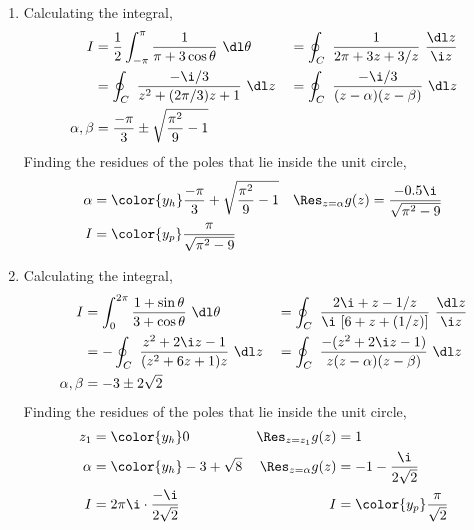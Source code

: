 \begin{enumerate}
    \item Calculating the integral,
          \begin{align}
              I             & = \frac{1}{2} \int_{-\pi}^{\pi} \frac{1}
              {\pi + 3\cos\theta} \ \dl \theta
                            &
                            & = \oint_C\ \frac{1}{2\pi + 3z + 3/z}
              \ \frac{\dl z}{\i z}                                             \\
                            & = \oint_C\ \frac{-\i/3}{z^2 + (2\pi/3) z + 1}
              \ \dl z       &
                            & = \oint_C\ \frac{-\i/3}{(z - \alpha)(z - \beta)}
              \ \dl z                                                          \\
              \alpha, \beta & = \frac{-\pi}{3} \pm \sqrt{\frac{\pi^2}{9} - 1}
          \end{align}
          Finding the residues of the poles that lie inside the unit circle,
          \begin{align}
              \alpha                 & = \color{y_h} \frac{-\pi}{3}
              + \sqrt{\frac{\pi^2}{9} - 1}
                                     &
              \Res_{z = \alpha} g(z) & = \frac{-0.5\i}{\sqrt{\pi^2 - 9}}          \\
              I                      & = \color{y_p} \frac{\pi}{\sqrt{\pi^2 - 9}}
          \end{align}

    \item Calculating the integral,
          \begin{align}
              I             & = \int_{0}^{2\pi} \frac{1 + \sin \theta}
              {3 + \cos\theta} \ \dl \theta
                            &
                            & = \oint_C\ \frac{2\i + z - 1/z}{\i\ [6 + z + (1/z)]}
              \ \frac{\dl z}{\i z}                                                 \\
                            & = -\oint_C\ \frac{z^2 + 2\i z - 1}{(z^2 + 6z + 1)z}
              \ \dl z       &
                            & = \oint_C\ \frac{-(z^2 + 2\i z - 1)}
              {z(z - \alpha)(z - \beta)} \ \dl z                                   \\
              \alpha, \beta & = -3 \pm 2\sqrt{2}
          \end{align}
          Finding the residues of the poles that lie inside the unit circle,
          \begin{align}
              z_1                    & = \color{y_h} 0                      &
              \Res_{z = z_1} g(z)    & = 1                                    \\
              \alpha                 & = \color{y_h} -3 + \sqrt{8}          &
              \Res_{z = \alpha} g(z) & = -1 - \frac{\i}{2\sqrt{2}}            \\
              I                      & = 2\pi\i \cdot \frac{-\i}{2\sqrt{2}} &
              I                      & = \color{y_p} \frac{\pi}{\sqrt{2}}
          \end{align}


\end{enumerate}
